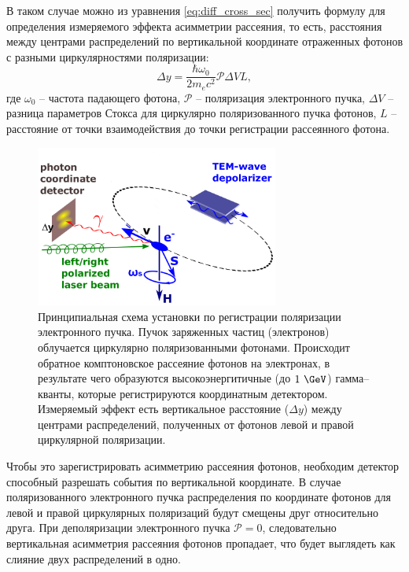 \par В таком случае можно из уравнения \ref{eq:diff_cross_sec} получить формулу для определения измеряемого эффекта асимметрии рассеяния, то есть, расстояния между центрами распределений по вертикальной координате отраженных фотонов с разными циркулярностями поляризации:
\begin{equation}
	\Delta y = \frac{\hbar \omega_0}{2 m_e c^2} \mathcal{P} \Delta V L,
	\label{eq:pol_effect}
\end{equation}
где $\omega_0$ -- частота падающего фотона, $\mathcal{P}$ -- поляризация электронного пучка, $\Delta V$ -- разница параметров Стокса для циркулярно поляризованного пучка фотонов, $L$ -- расстояние от точки взаимодействия до точки регистрации рассеянного фотона. 
\begin{figure}[H]
	\begin{center}
		\includegraphics[width = 8cm]{img/mrd-lsrp.png}
		\caption{Принципиальная схема установки по регистрации поляризации электронного пучка. Пучок заряженных частиц (электронов) облучается циркулярно поляризованными фотонами. Происходит обратное комптоновское рассеяние фотонов на электронах, в результате чего образуются высокоэнергитичные (до $1~\GeV$) гамма--кванты, которые регистрируются координатным детектором. Измеряемый эффект есть вертикальное расстояние ($\Delta y$) между центрами распределений, полученных от фотонов левой и правой циркулярной поляризации.}
		\label{fig:laser_polarimeter_scheme}
	\end{center}
\end{figure}
\vspace{-20pt}
Чтобы это зарегистрировать асимметрию рассеяния фотонов, необходим детектор способный разрешать события по вертикальной координате. В случае поляризованного электронного пучка распределения по координате фотонов для левой и правой циркулярных поляризаций будут смещены друг относительно друга. При деполяризации электронного пучка $\mathcal{P} = 0$, следовательно вертикальная асимметрия рассеяния фотонов пропадает, что будет выглядеть как слияние двух распределений в одно.\vspace{-10pt}

